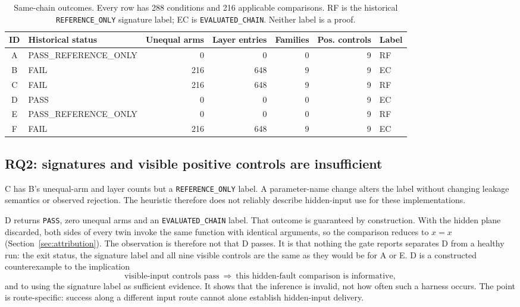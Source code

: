 \documentclass[11pt]{article}
\begin{document}
\begin{table}[t]
\centering\small
\caption{Same-chain outcomes. Every row has 288 conditions and 216 applicable comparisons. RF is the historical \texttt{REFERENCE\_ONLY} signature label; EC is \texttt{EVALUATED\_CHAIN}. Neither label is a proof.}
\label{tab:outcomes}
\begin{tabular}{@{}clrrrrl@{}}
\toprule
ID & Historical status & Unequal arms & Layer entries & Families & Pos. controls & Label\\
\midrule
A & PASS\_REFERENCE\_ONLY & 0 & 0 & 0 & 9 & RF\\
B & FAIL & 216 & 648 & 9 & 9 & EC\\
C & FAIL & 216 & 648 & 9 & 9 & RF\\
D & PASS & 0 & 0 & 0 & 9 & EC\\
E & PASS\_REFERENCE\_ONLY & 0 & 0 & 0 & 9 & RF\\
F & FAIL & 216 & 648 & 9 & 9 & EC\\
\bottomrule
\end{tabular}
\end{table}

\subsection{RQ2: signatures and visible positive controls are insufficient}
C has B's unequal-arm and layer counts but a \texttt{REFERENCE\_ONLY} label. A parameter-name change alters the label without changing leakage semantics or observed rejection. The heuristic therefore does not reliably describe hidden-input use for these implementations.

D returns \texttt{PASS}, zero unequal arms and an \texttt{EVALUATED\_CHAIN} label. That outcome is guaranteed by construction. With the hidden plane discarded, both sides of every twin invoke the same function with identical arguments, so the comparison reduces to \(x=x\) (Section~\ref{sec:attribution}). The observation is therefore not that D passes. It is that nothing the gate reports separates D from a healthy run: the exit status, the signature label and all nine visible controls are the same as they would be for A or E. D is a constructed counterexample to the implication
\[
\text{visible-input controls pass}
\ \Longrightarrow\
\text{this hidden-fault comparison is informative},
\]
and to using the signature label as sufficient evidence. It shows that the inference is invalid, not how often such a harness occurs. The point is route-specific: success along a different input route cannot alone establish hidden-input delivery.
\end{document}

